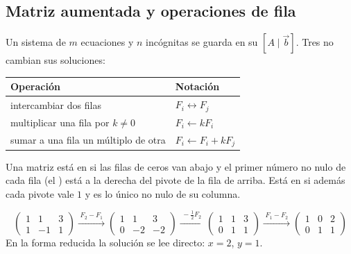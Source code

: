 \documentclass[11pt,a4paper]{article}
\newcommand{\aug}[2]{\left(\begin{array}{#1}#2\end{array}\right)}
\newcommand{\op}[1]{\xrightarrow{\;#1\;}}
\begin{document}
\subsection{Matriz aumentada y operaciones de fila}
Un sistema de $m$ ecuaciones y $n$ incógnitas se guarda en su  $[A\mid\vec b]$.
Tres  no cambian sus soluciones:
\begin{center}
\begin{tabular}{@{}l l@{}}
\toprule
Operación & Notación\\ \midrule
intercambiar dos filas & $F_i\leftrightarrow F_j$\\
multiplicar una fila por $k\neq0$ & $F_i\leftarrow kF_i$\\
sumar a una fila un múltiplo de otra & $F_i\leftarrow F_i+kF_j$\\
\bottomrule
\end{tabular}
\end{center}

\begin{definicion}
Una matriz está en  si las filas de ceros van abajo y el primer número no nulo de cada fila
(el ) está a la derecha del pivote de la fila de arriba. Está en  si además cada
pivote vale $1$ y es lo único no nulo de su columna.
\end{definicion}

\begin{ejemplo}
\[ \aug{cc|c}{1 & 1 & 3\\ 1 & -1 & 1}\op{F_2-F_1}\aug{cc|c}{1 & 1 & 3\\ 0 & -2 & -2}
\op{-\frac12F_2}\aug{cc|c}{1 & 1 & 3\\ 0 & 1 & 1}\op{F_1-F_2}\aug{cc|c}{1 & 0 & 2\\ 0 & 1 & 1} \]
En la forma reducida la solución se lee directo: $x=2$, $y=1$.
\end{ejemplo}
\end{document}
